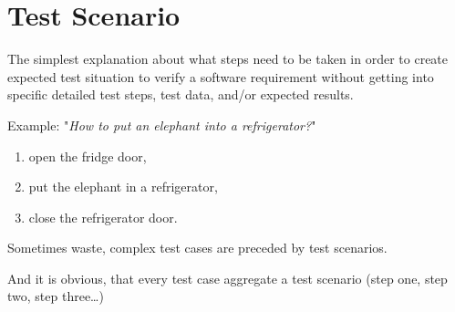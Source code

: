 \section{Test Scenario}
\label{sec:Test Scenario}

The simplest explanation about what steps need to be taken in order to create expected test situation to verify a software requirement without getting into specific detailed test steps, test data, and/or expected results.

Example: "\textit{How to put an elephant into a refrigerator?}" 

    \begin{enumerate}
\item open the fridge door,
\item put the elephant in a refrigerator, 
\item close the refrigerator door.
\end{enumerate}

Sometimes waste, complex test cases are preceded by test scenarios.

And it is obvious, that every test case aggregate a test scenario (step one, step two, step three\ldots)